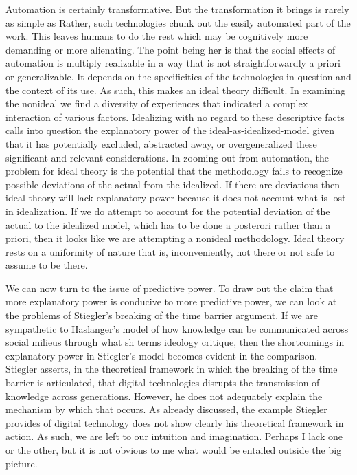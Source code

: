 \documentclass[letterpaper,notitlepage,12pt]{article}
\begin{document}
Automation is certainly transformative.
But the transformation it brings is rarely as simple as 
Rather, such technologies chunk out the easily automated part of the work.
This leaves humans to do the rest which may be cognitively more demanding or
more alienating.
The point being her is that the social effects of automation is multiply
realizable in a way that is not straightforwardly a priori or generalizable.
It depends on the specificities of the technologies in question and the context
of its use.
As such, this makes an ideal theory difficult.
In examining the nonideal we find a diversity of experiences that indicated a
complex interaction of various factors.
Idealizing with no regard to these descriptive facts calls into question the
explanatory power of the ideal-as-idealized-model given that it has potentially
excluded, abstracted away, or overgeneralized these significant and relevant
considerations.
In zooming out from automation, the problem for ideal theory is the potential
that the methodology fails to recognize possible deviations of the actual from
the idealized.
If there are deviations then ideal theory will lack explanatory power because it
does not account what is lost in idealization.
If we do attempt to account for the potential deviation of the actual to the
idealized model, which has to be done a posterori rather than a priori, then it
looks like we are attempting a nonideal methodology.
Ideal theory rests on a uniformity of nature that is, inconveniently, not there
or not safe to assume to be there.

We can now turn to the issue of predictive power.
To draw out the claim that more explanatory power is conducive to more
predictive power, we can look at the problems of Stiegler's breaking of the time
barrier argument.
If we are sympathetic to Haslanger's model of how knowledge can be communicated
across social milieus through what sh terms ideology critique, then the
shortcomings in explanatory power in Stiegler's model becomes evident in the
comparison.
Stiegler asserts, in the theoretical framework in which the breaking of the time
barrier is articulated, that digital technologies disrupts the transmission of
knowledge across generations.
However, he does not adequately explain the mechanism by which that occurs.
As already discussed, the example Stiegler provides of digital technology does
not show clearly his theoretical framework in action.
As such, we are left to our intuition and imagination.
Perhaps I lack one or the other, but it is not obvious to me what would be
entailed outside the big picture.
\end{document}
